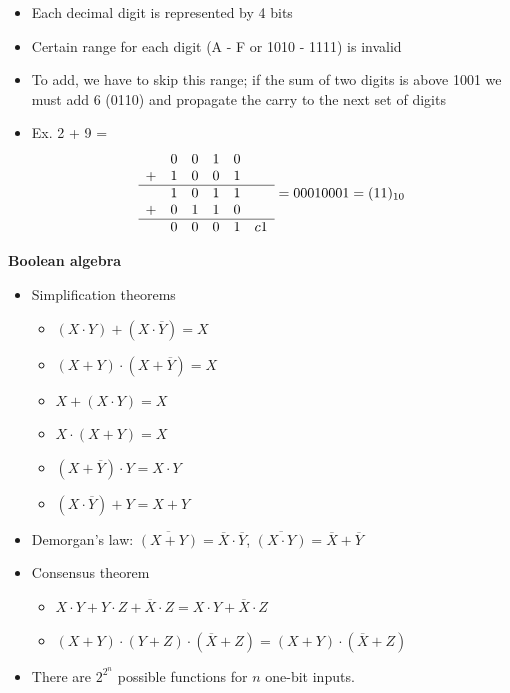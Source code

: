 \documentclass{article}
\begin{document}
\begin{itemize}
    \item Each decimal digit is represented by 4 bits
    \item Certain range for each digit (A - F or 1010 - 1111) is invalid
    \item To add, we have to skip this range; if the sum of two digits is above 1001 we must add 6 (0110) and propagate the carry to the next set of digits
    \item Ex. 2 + 9 =
    \begin{equation*}
        \begin{array}{cccccc}
              & 0 & 0 & 1 & 0 & \\
            + & 1 & 0 & 0 & 1 & \\
            \hline
              & 1 & 0 & 1 & 1 & \\
            + & 0 & 1 & 1 & 0 & \\
            \hline
              & 0 & 0 & 0 & 1 & c 1\\
        \end{array}
        = 0001 0001 = (11)_{10}
    \end{equation*}
\end{itemize}
\textbf{Boolean algebra}
\begin{itemize}
    \item Simplification theorems
    \begin{itemize}
        \item $(X \cdot Y) + (X \cdot \overline{Y}) = X$
        \item $(X + Y) \cdot (X + \overline{Y}) = X$
        \item $X + (X \cdot Y) = X$
        \item $X \cdot (X + Y) = X$
        \item $(X + \overline{Y}) \cdot Y = X \cdot Y$
        \item $(X \cdot \overline{Y}) + Y = X + Y$
    \end{itemize}
    \item Demorgan's law: $\overline{(X + Y)} = \overline{X} \cdot \overline{Y}$, $\overline{(X \cdot Y)} = \overline{X} + \overline{Y}$
    \item Consensus theorem
    \begin{itemize}
        \item $X \cdot Y + Y \cdot Z + \overline{X} \cdot Z = X \cdot Y + \overline{X} \cdot Z$
        \item $(X + Y) \cdot (Y + Z) \cdot (\overline{X} + Z) = (X + Y) \cdot (\overline{X} + Z)$
    \end{itemize}
    \item There are $2^{2^n}$ possible functions for $n$ one-bit inputs.
\end{itemize}
\end{document}
